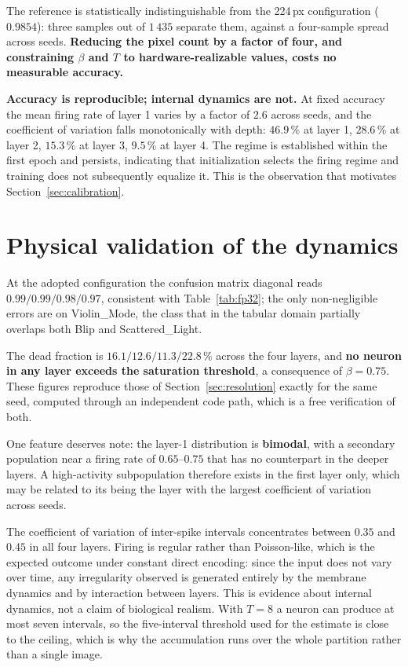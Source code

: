 The reference is statistically indistinguishable from the 224\,px configuration
($0.9854$): three samples out of $1\,435$ separate them, against a four-sample
spread across seeds. \textbf{Reducing the pixel count by a factor of four, and
constraining $\beta$ and $T$ to hardware-realizable values, costs no measurable
accuracy.}

\textbf{Accuracy is reproducible; internal dynamics are not.} At fixed accuracy
the mean firing rate of layer 1 varies by a factor of $2.6$ across seeds, and the
coefficient of variation falls monotonically with depth: $46.9$\,\% at layer 1,
$28.6$\,\% at layer 2, $15.3$\,\% at layer 3, $9.5$\,\% at layer 4. The regime is
established within the first epoch and persists, indicating that initialization
selects the firing regime and training does not subsequently equalize it. This is
the observation that motivates Section~\ref{sec:calibration}.

\section{Physical validation of the dynamics}

At the adopted configuration the confusion matrix diagonal reads
$0.99 / 0.99 / 0.98 / 0.97$, consistent with Table~\ref{tab:fp32}; the only
non-negligible errors are on Violin\_Mode, the class that in the tabular domain
partially overlaps both Blip and Scattered\_Light.

The dead fraction is $16.1 / 12.6 / 11.3 / 22.8$\,\% across the four layers, and
\textbf{no neuron in any layer exceeds the saturation threshold}, a consequence
of $\beta = 0.75$. These figures reproduce those of Section~\ref{sec:resolution}
exactly for the same seed, computed through an independent code path, which is a
free verification of both.

One feature deserves note: the layer-1 distribution is \textbf{bimodal}, with a
secondary population near a firing rate of $0.65$--$0.75$ that has no counterpart
in the deeper layers. A high-activity subpopulation therefore exists in the first
layer only, which may be related to its being the layer with the largest
coefficient of variation across seeds.

The coefficient of variation of inter-spike intervals concentrates between $0.35$
and $0.45$ in all four layers. Firing is regular rather than Poisson-like, which
is the expected outcome under constant direct encoding: since the input does not
vary over time, any irregularity observed is generated entirely by the membrane
dynamics and by interaction between layers. This is evidence about internal
dynamics, not a claim of biological realism. With $T = 8$ a neuron can produce at
most seven intervals, so the five-interval threshold used for the estimate is
close to the ceiling, which is why the accumulation runs over the whole partition
rather than a single image.

